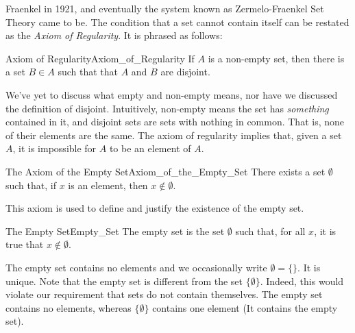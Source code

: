     Fraenkel in 1921, and eventually the system known as Zermelo-Fraenkel
    Set Theory came to be. The condition that a set cannot contain itself can
    be restated as the \textit{Axiom of Regularity}. It is phrased as follows:
    \begin{faxiom}{Axiom of Regularity}{Axiom_of_Regularity}
        If $A$ is a non-empty set, then there is a set $B\in{A}$
        such that that $A$ and $B$ are disjoint.
    \end{faxiom}
    We've yet to discuss what empty and non-empty means, nor have we discussed
    the definition of disjoint. Intuitively, non-empty means the set has
    \textit{something} contained in it, and disjoint sets are sets with
    nothing in common. That is, none of their elements are the same. The axiom
    of regularity implies that, given a set $A$, it is impossible for $A$
    to be an element of $A$.
    \begin{faxiom}{The Axiom of the Empty Set}{Axiom_of_the_Empty_Set}
        There exists a set $\emptyset$ such that, if $x$ is an element,
        then $x\notin\emptyset$.
    \end{faxiom}
    This axiom is used to define and justify the existence of the empty set.
    \begin{fdefinition}{The Empty Set}{Empty_Set}
        The \gls{empty set} is the set $\emptyset$ such that,
        for all $x$, it is true that $x\notin\emptyset$.
    \end{fdefinition}
    The empty set contains no elements and we occasionally write
    $\emptyset=\{\}$. It is unique. Note that the empty set is different from
    the set $\{\emptyset\}$. Indeed, this would violate our requirement that
    sets do not contain themselves. The empty set contains no elements,
    whereas $\{\emptyset\}$ contains one element (It contains the empty set).
